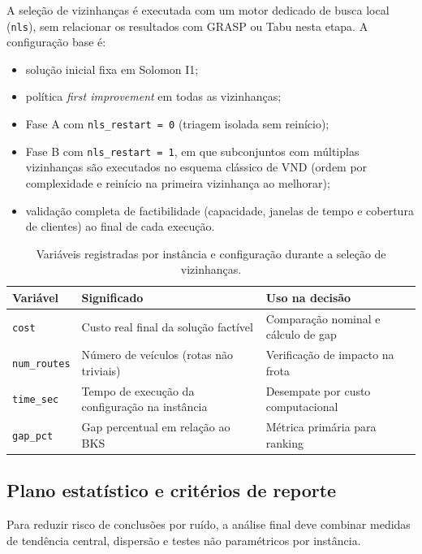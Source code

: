 A seleção de vizinhanças é executada com um motor dedicado de busca local (\texttt{nls}), sem relacionar os resultados com GRASP ou Tabu nesta etapa.
A configuração base é:
\begin{itemize}
  \item solução inicial fixa em Solomon I1;
  \item política \emph{first improvement} em todas as vizinhanças;
  \item Fase A com \texttt{nls\_restart = 0} (triagem isolada sem reinício);
  \item Fase B com \texttt{nls\_restart = 1}, em que subconjuntos com múltiplas vizinhanças são executados no esquema clássico de VND (ordem por complexidade e reinício na primeira vizinhança ao melhorar);
  \item validação completa de factibilidade (capacidade, janelas de tempo e cobertura de clientes) ao final de cada execução.
\end{itemize}

\begin{table}[htbp]
\centering
\caption{Variáveis registradas por instância e configuração durante a seleção de vizinhanças.}
\label{tab:neighborhood_selection_variables}
\begin{tabular}{p{3.3cm}p{5.0cm}p{5.0cm}}
\hline
Variável & Significado & Uso na decisão \\
\hline
\texttt{cost} & Custo real final da solução factível & Comparação nominal e cálculo de gap \\
\texttt{num\_routes} & Número de veículos (rotas não triviais) & Verificação de impacto na frota \\
\texttt{time\_sec} & Tempo de execução da configuração na instância & Desempate por custo computacional \\
\texttt{gap\_pct} & Gap percentual em relação ao BKS & Métrica primária para ranking \\
\hline
\end{tabular}
\end{table}

\subsection{Plano estatístico e critérios de reporte}
\label{subsec:plano_estatistico}

Para reduzir risco de conclusões por ruído, a análise final deve combinar medidas de tendência central, dispersão e testes não paramétricos por instância.

